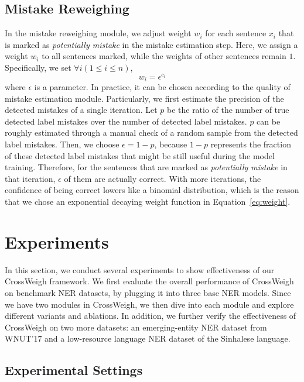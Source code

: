 \documentclass[11pt,a4paper]{article}
\newcommand{\our}{\mbox{\sf CrossWeigh}\xspace}
\begin{document}
    
    \subsection{Mistake Reweighing} 
    
        In the mistake reweighing module, we adjust weight $w_i$ for each sentence $x_i$ that is marked as \textit{potentially mistake} in the mistake estimation step.
        Here, we assign a weight $w_i$ to all sentences marked, while the weights of other sentences remain $1$. 
        Specifically, we set $\forall i (1 \le i \le n)$, 
        \begin{equation}\label{eq:weight}
            w_i = \epsilon^{c_i}
        \end{equation}
        where $\epsilon$ is a parameter.
        In practice, it can be chosen according to the quality of mistake estimation module. 
        Particularly, we first estimate the precision of the detected mistakes of a single iteration. 
        Let $p$ be the ratio of the number of true detected label mistakes over the number of detected label mistakes.
        $p$ can be roughly estimated through a manual check of a random sample from the detected label mistakes.
        Then, we choose $\epsilon = 1 - p$, because $1 - p$ represents the fraction of these detected label mistakes that might be still useful during the model training. 
        Therefore, for the sentences that are marked as \textit{potentially mistake} in that iteration, $\epsilon$ of them are actually correct. 
        With more iterations, the confidence of being correct lowers like a binomial distribution, which is the reason that we chose an exponential decaying weight function in Equation~\ref{eq:weight}.  \section{Experiments}\label{sec:exp}

In this section, we conduct several experiments to show effectiveness of our \our framework.
We first evaluate the overall performance of \our on benchmark NER datasets, by plugging it into three base NER models.
Since we have two modules in \our, we then dive into each module and explore different variants and ablations.
In addition, we further verify the effectiveness of \our on two more datasets: an emerging-entity NER dataset from WNUT'17 and a low-resource language NER dataset of the Sinhalese language.

    \subsection{Experimental Settings}
    
\end{document}
